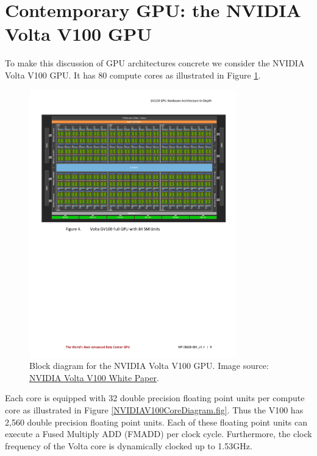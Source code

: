 \section{Contemporary GPU: the NVIDIA Volta V100 GPU}

To make this discussion of GPU architectures concrete we consider the NVIDIA Volta V100 GPU. It has 80 compute cores as illustrated in Figure \ref{NVIDIAV100BlockDiagram.fig}.

\begin{figure}[htbp!]
    \centering
    \includegraphics[width=0.8\textwidth]{figures/L24/NVIDIAVoltaV100GPUBlockDiagram.pdf}
    \caption{Block diagram for the NVIDIA Volta V100 GPU. Image source: \href{https://images.nvidia.com/content/volta-architecture/pdf/volta-architecture-whitepaper.pdf}{NVIDIA Volta V100 White Paper}.}
    \label{NVIDIAV100BlockDiagram.fig}
\end{figure}
Each core is equipped with 32 double precision floating point units per compute core as illustrated in Figure \ref{NVIDIAV100CoreDiagram.fig}. Thus the V100 has 2,560 double precision floating point units. Each of these floating point units can execute a Fused Multiply ADD (FMADD) per clock cycle. Furthermore, the clock frequency of the Volta core is dynamically clocked up to 1.53GHz. 
